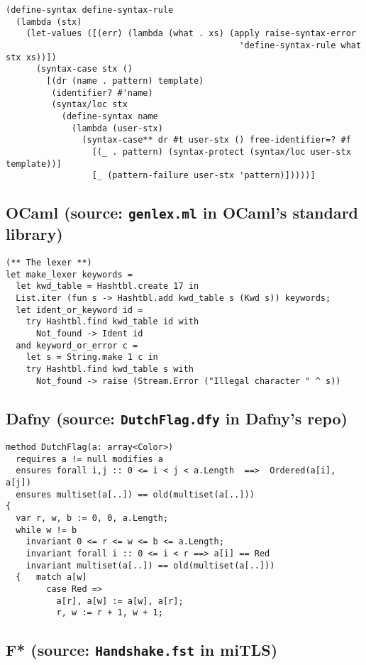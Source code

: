 \documentclass{article}
\begin{document}
\begin{verbatim}
(define-syntax define-syntax-rule
  (lambda (stx)
    (let-values ([(err) (lambda (what . xs) (apply raise-syntax-error
                                              'define-syntax-rule what stx xs))])
      (syntax-case stx ()
        [(dr (name . pattern) template)
         (identifier? #'name)
         (syntax/loc stx
           (define-syntax name
             (lambda (user-stx)
               (syntax-case** dr #t user-stx () free-identifier=? #f
                 [(_ . pattern) (syntax-protect (syntax/loc user-stx template))]
                 [_ (pattern-failure user-stx 'pattern)]))))]
\end{verbatim}

\subsection*{OCaml (source: \texttt{genlex.ml} in OCaml's standard library)}

\begin{verbatim}
(** The lexer **)
let make_lexer keywords =
  let kwd_table = Hashtbl.create 17 in
  List.iter (fun s -> Hashtbl.add kwd_table s (Kwd s)) keywords;
  let ident_or_keyword id =
    try Hashtbl.find kwd_table id with
      Not_found -> Ident id
  and keyword_or_error c =
    let s = String.make 1 c in
    try Hashtbl.find kwd_table s with
      Not_found -> raise (Stream.Error ("Illegal character " ^ s))
\end{verbatim}

\subsection*{Dafny (source: \texttt{DutchFlag.dfy} in Dafny's repo)}

\begin{verbatim}
method DutchFlag(a: array<Color>)
  requires a != null modifies a
  ensures forall i,j :: 0 <= i < j < a.Length  ==>  Ordered(a[i], a[j])
  ensures multiset(a[..]) == old(multiset(a[..]))
{
  var r, w, b := 0, 0, a.Length;
  while w != b
    invariant 0 <= r <= w <= b <= a.Length;
    invariant forall i :: 0 <= i < r ==> a[i] == Red
    invariant multiset(a[..]) == old(multiset(a[..]))
  {   match a[w]
        case Red =>
          a[r], a[w] := a[w], a[r];
          r, w := r + 1, w + 1;
\end{verbatim}

\subsection*{F* (source: \texttt{Handshake.fst} in miTLS)}
\end{document}
